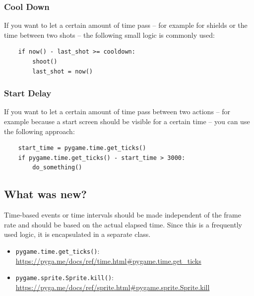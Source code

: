 \subsubsection{Cool Down}

If you want to let a certain amount of time pass -- for example for shields or the time between two shots -- the following small logic is commonly used:

\lstset{firstnumber = 1}
\begin{lstlisting}
	if now() - last_shot >= cooldown:
		shoot()
		last_shot = now()
\end{lstlisting}

\subsubsection{Start Delay}

If you want to let a certain amount of time pass between two actions -- for example because a start screen should be visible for a certain time -- you can use the following approach:

\lstset{firstnumber = 1}
\begin{lstlisting}
	start_time = pygame.time.get_ticks()
	if pygame.time.get_ticks() - start_time > 3000:
		do_something()
\end{lstlisting}



\subsection{What was new?}
\begin{hintbox}
	Time-based events or time intervals should be made independent of the frame rate and should be based on the actual elapsed time. Since this is a frequently used logic, it is encapsulated in a separate class.
\end{hintbox}

\begin{pygbox}
\begin{itemize}
	\item \texttt{pygame.time.get\_ticks()}:
	\\ 
    \url{https://pyga.me/docs/ref/time.html#pygame.time.get_ticks}
	
	\item \texttt{pygame.sprite.Sprite.kill()}:
	\\ 
	\url{https://pyga.me/docs/ref/sprite.html#pygame.sprite.Sprite.kill}

\end{itemize}
\end{pygbox}

